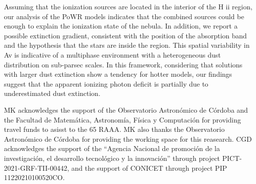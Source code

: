 \documentclass[baaa]{baaa}
\begin{document}
Assuming that the ionization sources are located in the interior of the H {\sc ii} region, our analysis of the PoWR models indicates that the combined sources could be enough to explain the ionization state of the nebula. In addition, we report a possible extinction gradient, consistent with the position of the absorption band and the hypothesis that the stars are inside the region. This spatial variability in Av is indicative of a multiphase environment with a heterogeneous dust distribution on sub-parsec scales. In this framework, 
considering that solutions with larger dust extinction show a tendency for hotter models, 
our findings suggest that the apparent ionizing photon deficit is 
partially due to underestimated dust extinction.

\begin{acknowledgement}
MK acknowledges the support of the Observatorio  Astron\'omico de C\'ordoba and the Facultad de Matem\'atica, Astronom\'ia, F\'isica y Computaci\'on for providing travel funds to asisst to the 65 RAAA.  MK  also thanks  the Observatorio Astron\'omico de C\'ordoba for providing the working space for this reasearch.
 CGD  acknowledges the support of the ``Agencia Nacional de promoci\'on de la investigaci\'on, el desarrollo tecnol\'ogico y la innovaci\'on'' through project PICT-2021-GRF-TII-00442, and the support of CONICET through project PIP 11220210100520CO.
\end{acknowledgement}



\small

 
\end{document}
